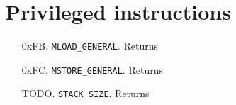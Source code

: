 \section{Privileged instructions}
\label{privileged-instructions}

\begin{enumerate}
  \item[0xFB.] \texttt{MLOAD\_GENERAL}. Returns
  \item[0xFC.] \texttt{MSTORE\_GENERAL}. Returns
  \item[TODO.] \texttt{STACK\_SIZE}. Returns
\end{enumerate}
